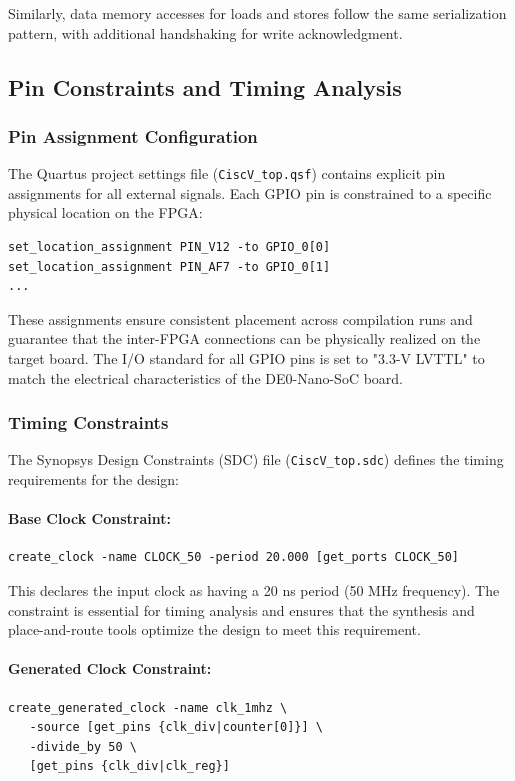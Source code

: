 \documentclass[12pt]{article}
\begin{document}
Similarly, data memory accesses for loads and stores follow the same serialization pattern, with additional handshaking for write acknowledgment.

\subsection{Pin Constraints and Timing Analysis}

\subsubsection{Pin Assignment Configuration}

The Quartus project settings file (\texttt{CiscV\_top.qsf}) contains explicit pin assignments for all external signals. Each GPIO pin is constrained to a specific physical location on the FPGA:

\begin{verbatim}
set_location_assignment PIN_V12 -to GPIO_0[0]
set_location_assignment PIN_AF7 -to GPIO_0[1]
...
\end{verbatim}

These assignments ensure consistent placement across compilation runs and guarantee that the inter-FPGA connections can be physically realized on the target board. The I/O standard for all GPIO pins is set to "3.3-V LVTTL" to match the electrical characteristics of the DE0-Nano-SoC board.

\subsubsection{Timing Constraints}

The Synopsys Design Constraints (SDC) file (\texttt{CiscV\_top.sdc}) defines the timing requirements for the design:

\paragraph{Base Clock Constraint:}
\begin{verbatim}
create_clock -name CLOCK_50 -period 20.000 [get_ports CLOCK_50]
\end{verbatim}

This declares the input clock as having a 20 ns period (50 MHz frequency). The constraint is essential for timing analysis and ensures that the synthesis and place-and-route tools optimize the design to meet this requirement.

\paragraph{Generated Clock Constraint:}
\begin{verbatim}
create_generated_clock -name clk_1mhz \
   -source [get_pins {clk_div|counter[0]}] \
   -divide_by 50 \
   [get_pins {clk_div|clk_reg}]
\end{verbatim}
\end{document}
